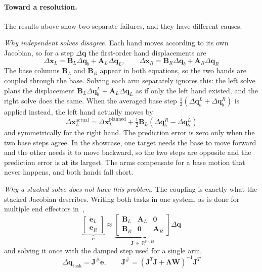 \documentclass[12pt,a4paper]{article}
\begin{document}
\paragraph*{Toward a resolution.}
The results above show two separate failures, and they have different causes.

\emph{Why independent solves disagree.}
Each hand moves according to its own Jacobian, so for a step $\Delta\mathbf{q}$ the first-order hand displacements are
\begin{equation}
    \Delta\mathbf{x}_L = \mathbf{B}_L\Delta\mathbf{q}_b + \mathbf{A}_L\Delta\mathbf{q}_L,
    \qquad
    \Delta\mathbf{x}_R = \mathbf{B}_R\Delta\mathbf{q}_b + \mathbf{A}_R\Delta\mathbf{q}_R
\end{equation}
The base columns $\mathbf{B}_L$ and $\mathbf{B}_R$ appear in both equations, so the two hands are coupled through the base. Solving each arm separately ignores this: the left solve plans the displacement $\mathbf{B}_L\Delta\mathbf{q}_b^{L}+\mathbf{A}_L\Delta\mathbf{q}_L$ as if only the left hand existed, and the right solve does the same. When the averaged base step $\tfrac12(\Delta\mathbf{q}_b^{L}+\Delta\mathbf{q}_b^{R})$ is applied instead, the left hand actually moves by
\begin{equation}
    \Delta\mathbf{x}_L^{\mathrm{actual}}
    = \Delta\mathbf{x}_L^{\mathrm{planned}}
    + \tfrac12\mathbf{B}_L\left(\Delta\mathbf{q}_b^{R}-\Delta\mathbf{q}_b^{L}\right)
\end{equation}
and symmetrically for the right hand. The prediction error is zero only when the two base steps agree. In the showcase, one target needs the base to move forward and the other needs it to move backward, so the two steps are opposite and the prediction error is at its largest. The arms compensate for a base motion that never happens, and both hands fall short.

\emph{Why a stacked solve does not have this problem.}
The coupling is exactly what the stacked Jacobian describes. Writing both tasks in one system, as is done for multiple end effectors in~\cite{bussKim2004},
\begin{equation}
    \underbrace{\begin{bmatrix}\mathbf{e}_L\\ \mathbf{e}_R\end{bmatrix}}_{\mathbf{e}}
    \approx
    \underbrace{\begin{bmatrix}\mathbf{B}_L & \mathbf{A}_L & \mathbf{0}\\ \mathbf{B}_R & \mathbf{0} & \mathbf{A}_R\end{bmatrix}}_{\mathbf{J}\,\in\,\mathbb{R}^{6\times 18}}
    \Delta\mathbf{q}
\end{equation}
and solving it once with the damped step used for a single arm,
\begin{equation}
    \Delta\mathbf{q}_{\mathrm{task}}=\mathbf{J}^{\#}\mathbf{e},
    \qquad
    \mathbf{J}^{\#}=\left(\mathbf{J}^{T}\mathbf{J}+\boldsymbol{\Lambda}\mathbf{W}\right)^{-1}\mathbf{J}^{T}
    \label{eq:stacked_dls}
\end{equation}
\end{document}
